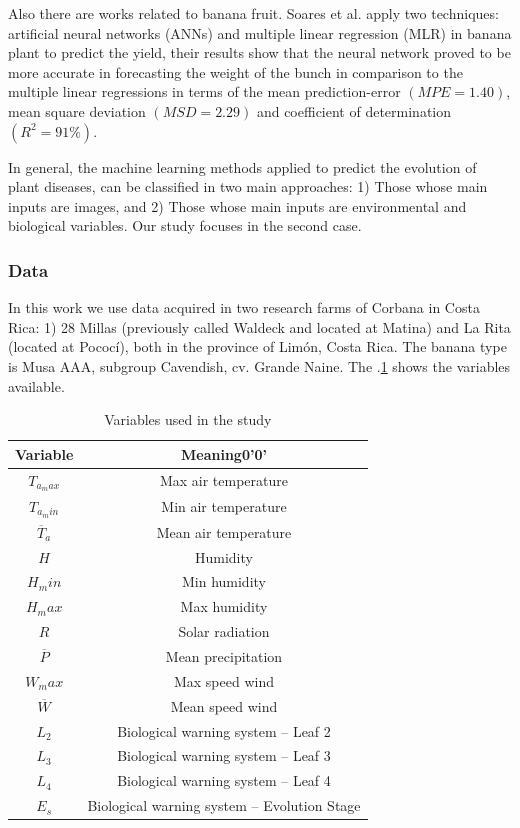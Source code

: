 \documentclass[review]{elsarticle}
\begin{document}
Also there are works related to banana fruit. Soares et al. \citep{Soares2014} apply two techniques: artificial neural networks (ANNs) and multiple linear regression (MLR) in banana plant to predict the yield, their results show that the neural network proved to be more accurate in forecasting the weight of the bunch in comparison to the multiple linear regressions in terms of the mean prediction-error $(MPE = 1.40)$, mean square deviation $(MSD = 2.29)$ and coefficient of determination $(R^2 = 91\%)$.

In general, the machine learning methods applied to predict the evolution of plant diseases, can be classified in two main approaches: 1) Those whose main inputs are images, and 2) Those whose main inputs are environmental and biological variables. Our study focuses in the second case.

\subsubsection{Data}
In this work we use data acquired in two research farms of Corbana in Costa Rica: 1) 28 Millas (previously called Waldeck and located at Matina) and La Rita (located at Pococí), both in the province of Limón, Costa Rica. The banana type is Musa AAA, subgroup Cavendish, cv. Grande Naine. The \tablename $.$\ref{tabla1} shows the variables available.

\begin{table}[h] 
\caption{Variables used in the study} 
\label{tabla1} 
\centering
\begin{tabular}{c|c} 
\hline
\bfseries Variable & \bfseries Meaning0'0' \\ 
\hline\hline 
$T_{a_max}$ &	Max air temperature \\
$T_{a_min}$ &	Min air temperature \\
$\overline{T}_{a}$	 & Mean air temperature \\
$H$	&  Humidity \\
$H_min$ &	Min humidity \\
$H_max$	& Max humidity \\
$R$	& Solar radiation \\
$\overline{P}$	& Mean precipitation  \\
$W_max$	& Max speed wind \\
$\overline{W}$	& Mean speed wind  \\
$L_2$	& Biological warning system – Leaf 2 \\
$L_3$	& Biological warning system – Leaf 3 \\
$L_4$	& Biological warning system – Leaf 4 \\
$E_s$	& Biological warning system – Evolution Stage \\
\hline
\end{tabular} 
\end{table}
\end{document}
